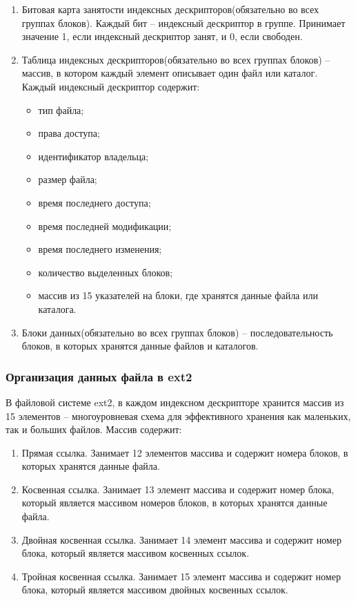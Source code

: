 \begin{enumerate}
\item Битовая карта занятости индексных дескрипторов(обязательно во всех группах блоков). Каждый бит -- индексный дескриптор в группе. Принимает значение 1, если индексный дескриптор занят, и 0, если свободен.
\item Таблица индексных дескрипторов(обязательно во всех группах блоков) -- массив, в котором каждый элемент описывает один файл или каталог.
Каждый индексный дескриптор содержит:
\begin{itemize}
\item тип файла;
\item права доступа;
\item идентификатор владельца;
\item размер файла;
\item время последнего доступа;
\item время последней модификации;
\item время последнего изменения;
\item количество выделенных блоков;
\item массив из 15 указателей на блоки, где хранятся данные файла или каталога.
\end{itemize}
\item Блоки данных(обязательно во всех группах блоков) -- последовательность блоков, в которых хранятся данные файлов и каталогов.
\end{enumerate}

\subsubsection{Организация данных файла в ext2}

В файловой системе ext2, в каждом индексном дескрипторе хранится массив из 15 элементов -- многоуровневая схема для эффективного хранения как маленьких, так и больших файлов.
Массив содержит:
\begin{enumerate}
\item Прямая ссылка. Занимает 12 элементов массива и содержит номера блоков, в которых хранятся данные файла.
\item Косвенная ссылка. Занимает 13 элемент массива и содержит номер блока, который является массивом номеров блоков, в которых хранятся данные файла.
\item Двойная косвенная ссылка. Занимает 14 элемент массива и содержит номер блока, который является массивом косвенных ссылок.
\item Тройная косвенная ссылка. Занимает 15 элемент массива и содержит номер блока, который является массивом двойных косвенных ссылок.
\end{enumerate}

